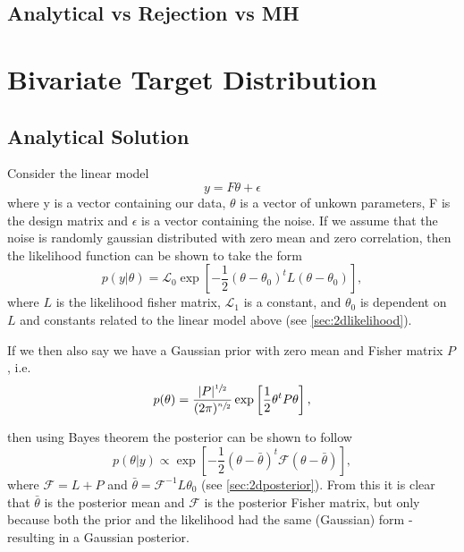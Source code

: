 \documentclass[a4paper,11pt,twoside]{article}
\begin{document}
\subsection{Analytical vs Rejection vs MH}

\section{Bivariate Target Distribution} 
\subsection{Analytical Solution}
Consider the linear model
\begin{equation}
	y = F\theta + \epsilon
\end{equation}
where y is a vector containing our data, $\theta$ is a vector of unkown
parameters, F is the design matrix and $\epsilon$ is a vector containing the
noise. If we assume that the noise is randomly gaussian distributed with zero
mean and zero correlation, then the likelihood function can be shown to take the form
\begin{equation}
	p(y|\theta) = \mathcal{L}_0 \exp\left[-\frac{1}{2}(\theta - \theta_0)^tL(\theta - \theta_0)\right],
\end{equation}
where $L$ is the likelihood fisher matrix, $\mathcal{L}_1$ is a constant, and
$\theta_0$ is dependent on $L$ and constants related to the linear model above
(see \cref{sec:2dlikelihood}).

If we then also say we have a Gaussian prior with zero mean and Fisher matrix $P$, i.e.
\begin{equation}
	p(\theta) = \frac{|P|^{\sfrac{1}{2}}}{(2\pi)^{\sfrac{n}{2}}} \exp \left[ \frac{1}{2} \theta^t P \theta \right],
\end{equation}

then using Bayes theorem the posterior can be shown to follow
\begin{equation}
	p(\theta|y) \propto \exp \left[ -\frac{1}{2} (\theta - \bar{\theta})^t \mathcal{F} (\theta - \bar{\theta}) \right],
\end{equation}
where $\mathcal{F} = L + P$ and $\bar{\theta} = \mathcal{F}^{-1}L\theta_0$ (see \cref{sec:2dposterior}).
From this it is clear that $\bar{\theta}$ is the posterior mean and
$\mathcal{F}$ is the posterior Fisher matrix, but only because both the prior
and the likelihood had the same (Gaussian) form - resulting in a Gaussian
posterior.
\end{document}
